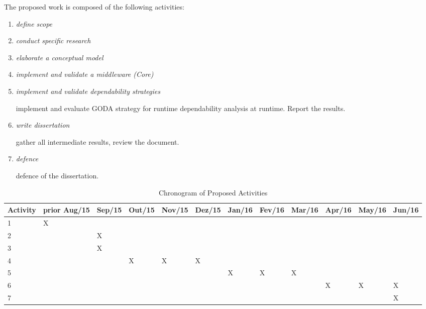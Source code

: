 The proposed work is composed of the following activities:

\begin{enumerate}
\item \emph{define scope}
\item \emph{conduct specific research}
\item \emph{elaborate a conceptual model}
\item \emph{implement and validate a middleware (Core)}

\item \emph{implement and validate dependability strategies}

implement and evaluate GODA\cite{mendonca_dependability_2015} strategy for runtime dependability analysis at runtime. Report the results.

\item \emph{write dissertation}

gather all intermediate results, review the document.

\item \emph{defence}

defence of the dissertation.

\end{enumerate}

\begin{table}[htbp]
\tiny
\begin{flushleft}
\begin{tabular}{|p{1.1cm}|p{0.75cm}|p{0.75cm}|p{0.75cm}|p{0.75cm}|p{0.75cm}|p{0.75cm}|p{0.75cm}|p{0.75cm}|p{0.75cm}|p{0.75cm}|p{0.75cm}|}
\hline
\textbf{Activity}&	\textbf{prior Aug/15}&	\textbf{Sep/15}&	\textbf{Out/15}&	\textbf{Nov/15}&	\textbf{Dez/15}&	\textbf{Jan/16}&	\textbf{Fev/16}&	\textbf{Mar/16}&	\textbf{Apr/16}&	\textbf{May/16}&	\textbf{Jun/16}\\
\hline	1			&	X	&			&	 		&			&		&		&	 		&	 		&	 	&		 &				\\
\hline	2			&		&	 X	&			&			&		&		&	 		&	 		&	 	&		 &				\\
\hline	3			&		&	 X	&			&			&		&		&	 		&	 		&	 	&		 &				\\
\hline	4			&		&	  	&	 X	&	X	  &	X	&		&	 	  &	   	&	 	&		 &				\\
\hline	5			&		&	 		&	 		&			&		&	X	&	 X	&	 X	&	  &		 &				\\
\hline	6			&		&	 		&	 		&			&		&		&	 		&	 		&	X	&	X	 &	X			\\
\hline	7			&		&	 		&	 		&			&		&		&	 		&	 		&	  &		 &	X			\\
\hline
\end{tabular}
\end{flushleft}
\caption{Chronogram of Proposed Activities}
\label{tbcrono}
\end{table}
